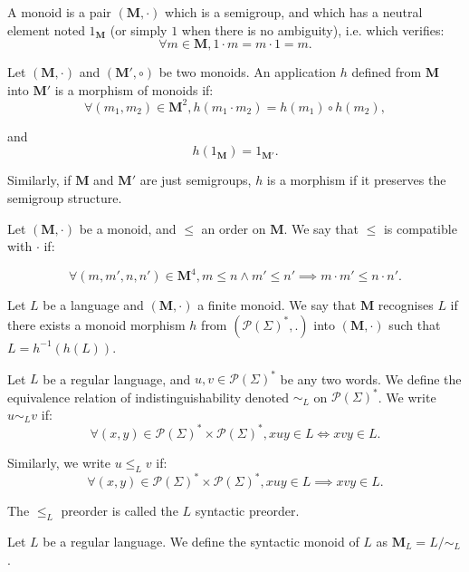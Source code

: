 \documentclass[a4paper,UKenglish,cleveref, autoref, thm-restate]{lipics-v2021}
\renewcommand{\alph}{\part(\Sigma)}
\newcommand{\op}{\cdot}
\renewcommand{\part}{\mathcal{P}}
\newcommand{\M}{\mathbf{M}}
\begin{document}
\begin{definition}
    A monoid is a pair $(\M, \op)$ which is a semigroup, and which has a neutral element noted $1_{\M}$ (or simply $1$ when there is no ambiguity), i.e. which verifies:
    $$
    \forall m \in \M, 1 \op m = m \op 1 = m.
    $$
\end{definition}


\begin{definition}
    Let $(\M, \op)$ and $(\M', \circ)$ be two monoids. An application $h$ defined from $\M$ into $\M'$ is a morphism of monoids if:
    $$
    \forall (m_1,m_2) \in \M^2, h(m_1 \op m_2) = h(m_1) \circ h(m_2),
    $$
    
    and
    $$
    h(1_{\M}) = 1_{\M'}.
    $$

    Similarly, if $\M$ and $\M'$ are just semigroups, $h$ is a morphism if it preserves the semigroup structure.
    
\end{definition}


\begin{definition}
    Let $(\M,\op)$ be a monoid, and $\leq$ an order on $\M$. We say that $\leq$ is compatible with $\op$ if:

    $$
    \forall (m,m',n,n') \in \M^4, m \leq n \land m' \leq n' \implies m \op m' \leq n \op n'.
    $$
\end{definition}



\begin{definition}
    Let $L$ be a language and $(\M, \op)$ a finite monoid. We say that $\M$ recognises $L$ if there exists a monoid morphism $h$ from $(\alph^*,.)$ into $(\M, \op)$ such that $L = h^{-1}(h(L))$.
\end{definition}

\begin{definition}
    Let $L$ be a regular language, and $u,v\in\alph^*$ be any two words. We define the equivalence relation of indistinguishability denoted $\sim_L$ on $\alph^*$. We write $u \sim_L v$ if:
    $$
    \forall (x,y) \in \alph^* \times \alph^*, xuy \in L \iff xvy \in L.
    $$

    Similarly, we write $u \leq_L v$ if:
    $$
    \forall (x,y) \in \alph^* \times \alph^*, xuy \in L \implies xvy \in L.
    $$

    The $\leq_L$ preorder is called the $L$ syntactic preorder.
\end{definition}


\begin{definition}
    Let $L$ be a regular language. We define the syntactic monoid of $L$ as $\M_L = L/\sim_L$.
\end{definition}
\end{document}
